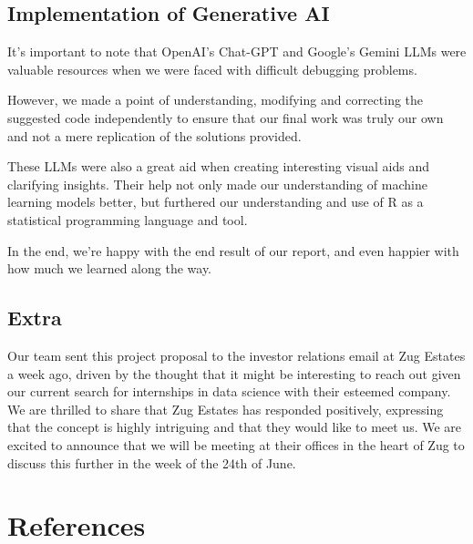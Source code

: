 \documentclass[
]{article}
\begin{document}
\subsection{Implementation of Generative
AI}\label{implementation-of-generative-ai}

It's important to note that OpenAI's Chat-GPT and Google's Gemini LLMs
were valuable resources when we were faced with difficult debugging
problems.

However, we made a point of understanding, modifying and correcting the
suggested code independently to ensure that our final work was truly our
own and not a mere replication of the solutions provided.

These LLMs were also a great aid when creating interesting visual aids
and clarifying insights. Their help not only made our understanding of
machine learning models better, but furthered our understanding and use
of R as a statistical programming language and tool.

In the end, we're happy with the end result of our report, and even
happier with how much we learned along the way.

\subsection{Extra}\label{extra}

Our team sent this project proposal to the investor relations email at
Zug Estates a week ago, driven by the thought that it might be
interesting to reach out given our current search for internships in
data science with their esteemed company. We are thrilled to share that
Zug Estates has responded positively, expressing that the concept is
highly intriguing and that they would like to meet us. We are excited to
announce that we will be meeting at their offices in the heart of Zug to
discuss this further in the week of the 24th of June.

\section{References}\label{references}
\end{document}
